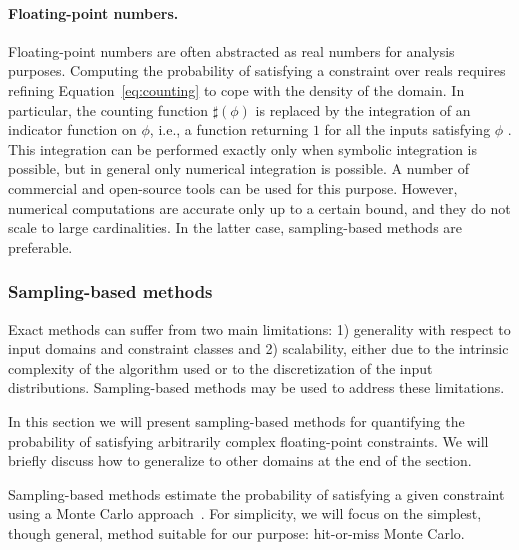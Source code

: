 \paragraph{Floating-point numbers.} 
Floating-point numbers are often abstracted as real numbers for analysis purposes. Computing the probability of satisfying a constraint over reals requires refining Equation~\ref{eq:counting} to cope with the density of the domain. In particular, the counting function $\sharp(\phi)$ is replaced by the integration of an indicator function on $\phi$, i.e., a function returning $1$ for all the inputs satisfying $\phi$ \cite{Borges2014}. This integration can be performed exactly only when symbolic integration is possible, but in general only numerical integration is possible. A number of commercial and open-source tools can be used for this purpose. However, numerical computations are accurate only up to a certain bound, and they do not scale to large cardinalities. In the latter case, sampling-based methods are preferable. 

\subsubsection{Sampling-based methods}\label{sec:computingprobabilitiesSampling}
Exact methods can suffer from two main limitations: 1) generality with respect to input domains and constraint classes and 2) scalability, either due to the intrinsic complexity of the algorithm used or to the discretization of the input distributions. Sampling-based methods may be used to address these limitations.

In this section we will present sampling-based methods for quantifying the probability of satisfying arbitrarily complex floating-point constraints. We will briefly discuss how to generalize to other domains at the end of the section.

Sampling-based methods estimate the probability of satisfying a given constraint using a Monte Carlo approach~\cite{robert2013monte}. For simplicity, we will focus on the simplest, though general, method suitable for our purpose: hit-or-miss Monte Carlo. %


